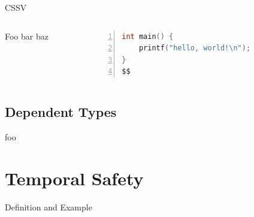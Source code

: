 \documentclass[aspectratio=169]{beamer}
\begin{document}
\begin{frame}[fragile]{CSSV}
  \footnotesize
  \begin{columns}[T]
    \begin{column}{0.45\textwidth}
        Foo bar baz
    \end{column}
    \begin{column}{0.45\textwidth}
%      
       \begin{lstlisting}[language=C,numbers=left,mathescape,basicstyle={\footnotesize\ttfamily}]
int main() {
    printf("hello, world!\n");
}
$$
        \end{lstlisting}
    \end{column}
  \end{columns}
\end{frame}


\subsection{Dependent Types}

\begin{frame}{foo}
\end{frame}

\section{Temporal Safety}

\begin{frame}[fragile]{Definition and Example}
    \footnotesize
\end{frame}
\end{document}
